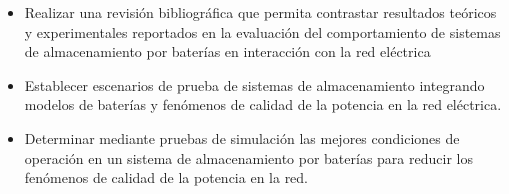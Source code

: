 
\begin{itemize}
    \item Realizar una revisión bibliográfica que permita contrastar resultados teóricos y experimentales reportados en la evaluación del comportamiento de sistemas de almacenamiento por baterías en interacción con la red eléctrica
    \item Establecer escenarios de prueba de sistemas de almacenamiento integrando modelos de baterías y fenómenos de calidad de la potencia en la red eléctrica.
    \item Determinar mediante pruebas de simulación las mejores condiciones de operación en un sistema de almacenamiento por baterías para reducir los fenómenos de calidad de la potencia en la red.
    
\end{itemize}